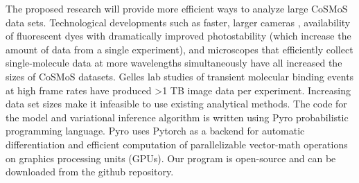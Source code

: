 The proposed research will provide more efficient ways to analyze large CoSMoS data sets. Technological developments such as faster, larger cameras \citep{Quan2011-cg}, availability of fluorescent dyes with dramatically improved photostability (which increase the amount of data from a single experiment), and microscopes that efficiently collect single-molecule data at more wavelengths simultaneously \citep{Friedman2006-kb} have all increased the sizes of CoSMoS datasets. Gelles lab studies of transient molecular binding events at high frame rates have produced >1 TB image data per experiment. Increasing data set sizes make it infeasible to use existing analytical methods. The code for the model and variational inference algorithm is written using Pyro probabilistic programming language. Pyro uses Pytorch as a backend for automatic differentiation and efficient computation of parallelizable vector-math operations on graphics processing units (GPUs). Our program is open-source and can be downloaded from the github repository.

